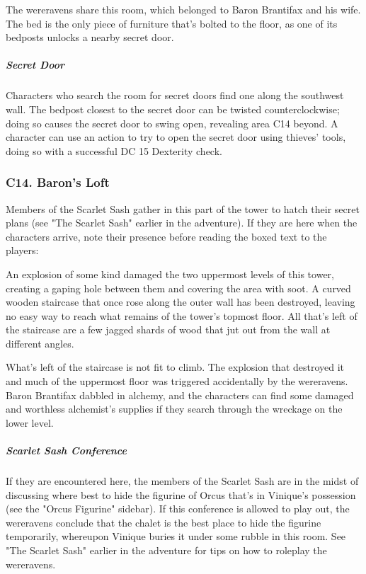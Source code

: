 \documentclass[10pt,a4paper,twoside,bg=print,twocolumn,openany,nodeprecatedcode]{dndbook}
\begin{document}
The wereravens share this room, which belonged to Baron Brantifax and his wife. The bed is the only piece of furniture that's bolted to the floor, as one of its bedposts unlocks a nearby secret door.

\subparagraph{Secret Door}
Characters who search the room for secret doors find one along the southwest wall. The bedpost closest to the secret door can be twisted counterclockwise; doing so causes the secret door to swing open, revealing area C14 beyond. A character can use an action to try to open the secret door using thieves' tools, doing so with a successful DC 15 Dexterity check.

\subsubsection{C14. Baron's Loft}
Members of the Scarlet Sash gather in this part of the tower to hatch their secret plans (see "The Scarlet Sash" earlier in the adventure). If they are here when the characters arrive, note their presence before reading the boxed text to the players:

\begin{DndReadAloud}{}
An explosion of some kind damaged the two uppermost levels of this tower, creating a gaping hole between them and covering the area with soot. A curved wooden staircase that once rose along the outer wall has been destroyed, leaving no easy way to reach what remains of the tower's topmost floor. All that's left of the staircase are a few jagged shards of wood that jut out from the wall at different angles. 

\end{DndReadAloud}

What's left of the staircase is not fit to climb. The explosion that destroyed it and much of the uppermost floor was triggered accidentally by the wereravens. Baron Brantifax dabbled in alchemy, and the characters can find some damaged and worthless alchemist's supplies if they search through the wreckage on the lower level.

\subparagraph{Scarlet Sash Conference}
If they are encountered here, the members of the Scarlet Sash are in the midst of discussing where best to hide the figurine of Orcus that's in Vinique's possession (see the "Orcus Figurine" sidebar). If this conference is allowed to play out, the wereravens conclude that the chalet is the best place to hide the figurine temporarily, whereupon Vinique buries it under some rubble in this room. See "The Scarlet Sash" earlier in the adventure for tips on how to roleplay the wereravens.
\end{document}
